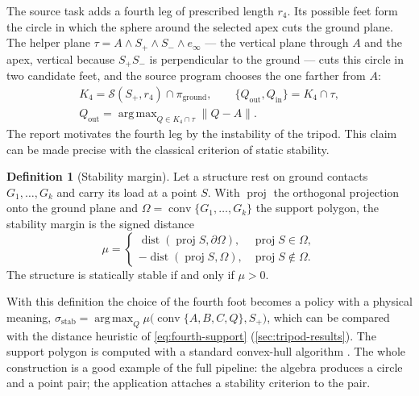 \documentclass[11pt,a4paper]{article}
\theoremstyle{plain}
\theoremstyle{definition}
\newtheorem{definition}{Definition}
\theoremstyle{remark}
\newcommand{\einf}{e_{\infty}}
\newcommand{\norm}[1]{\left\lVert#1\right\rVert}
\newcommand{\conv}{\operatorname{conv}}
\newcommand{\proj}{\operatorname{proj}}
\newcommand{\Sph}{\mathcal{S}}
\DeclareMathOperator*{\argmax}{arg\,max}
\begin{document}
The source task adds a fourth leg of prescribed length $r_4$. Its possible feet
form the circle in which the sphere around the selected apex cuts the ground
plane. The helper plane $\tau=A\wedge S_+\wedge S_-\wedge\einf$ --- the vertical
plane through $A$ and the apex, vertical because $S_+S_-$ is perpendicular to
the ground --- cuts this circle in two candidate feet, and the source program
chooses the one farther from $A$:
\begin{equation}
  \begin{gathered}
    K_4=\Sph(S_+,r_4)\cap\pi_{\mathrm{ground}},
    \qquad
    \{Q_{\mathrm{out}},Q_{\mathrm{in}}\}=K_4\cap\tau,\\
    Q_{\mathrm{out}}=\argmax_{Q\in K_4\cap\tau}\norm{Q-A}.
  \end{gathered}
  \label{eq:fourth-support}
\end{equation}
The report motivates the fourth leg by the instability of the tripod. This claim
can be made precise with the classical criterion of static stability.

\begin{definition}[Stability margin]\label{def:margin}
Let a structure rest on ground contacts $G_1,\dots,G_k$ and carry its load at a
point $S$. With $\proj$ the orthogonal projection onto the ground plane and
$\Omega=\conv\{G_1,\dots,G_k\}$ the support polygon, the stability margin is the
signed distance
\begin{equation}
  \mu=\begin{cases}
    \operatorname{dist}(\proj S,\partial\Omega), & \proj S\in\Omega,\\
    -\operatorname{dist}(\proj S,\Omega), & \proj S\notin\Omega.
  \end{cases}
  \label{eq:margin}
\end{equation}
The structure is statically stable if and only if $\mu>0$.
\end{definition}

With this definition the choice of the fourth foot becomes a policy with a
physical meaning,
$\sigma_{\mathrm{stab}}=\argmax_{Q}\mu\bigl(\conv\{A,B,C,Q\},S_+\bigr)$, which can
be compared with the distance heuristic of \cref{eq:fourth-support}
(\cref{sec:tripod-results}). The support polygon is computed with a standard
convex-hull algorithm \citep{deberg2008}. The whole construction is a good example
of the full pipeline: the algebra produces a circle and a point pair; the
application attaches a stability criterion to the pair.
\end{document}
